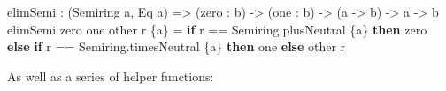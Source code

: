 \documentclass[
]{article}
\newenvironment{Shaded}{}{}
\newcommand{\DataTypeTok}[1]{\textcolor[rgb]{0.56,0.13,0.00}{#1}}
\newcommand{\KeywordTok}[1]{\textcolor[rgb]{0.00,0.44,0.13}{\textbf{#1}}}
\newcommand{\NormalTok}[1]{#1}
\newcommand{\OperatorTok}[1]{\textcolor[rgb]{0.40,0.40,0.40}{#1}}
\newcommand{\OtherTok}[1]{\textcolor[rgb]{0.00,0.44,0.13}{#1}}
\begin{document}
\begin{Shaded}
\begin{Highlighting}[]
\NormalTok{elimSemi }\OperatorTok{:}\NormalTok{ (}\DataTypeTok{Semiring}\NormalTok{ a, }\DataTypeTok{Eq}\NormalTok{ a) }\OtherTok{=\textgreater{}}\NormalTok{ (zero }\OperatorTok{:}\NormalTok{ b) }\OtherTok{{-}\textgreater{}}\NormalTok{ (one }\OperatorTok{:}\NormalTok{ b) }\OtherTok{{-}\textgreater{}}\NormalTok{ (a }\OtherTok{{-}\textgreater{}}\NormalTok{ b) }\OtherTok{{-}\textgreater{}}\NormalTok{ a }\OtherTok{{-}\textgreater{}}\NormalTok{ b}
\NormalTok{elimSemi zero one other r \{a\} }\OtherTok{=}
  \KeywordTok{if}\NormalTok{ r }\OperatorTok{==}\NormalTok{ Semiring.plusNeutral \{a\}}
     \KeywordTok{then}\NormalTok{ zero}
     \KeywordTok{else} \KeywordTok{if}\NormalTok{ r }\OperatorTok{==}\NormalTok{ Semiring.timesNeutral \{a\}}
             \KeywordTok{then}\NormalTok{ one}
             \KeywordTok{else}\NormalTok{ other r}
\end{Highlighting}
\end{Shaded}

As well as a series of helper functions:
\end{document}
